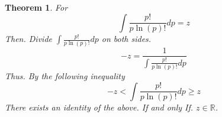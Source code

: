\documentclass[11pt, a4paper]{article}
\theoremstyle{plain}
\newtheorem{theorem}{Theorem}[section]
\theoremstyle{definition}
\theoremstyle{remark}
\begin{document}
\begin{theorem}
  For
  \begin{equation}
    \int \frac{p!}{p\ln \left(p\right)!}dp = z
  \end{equation}
  Then. Divide $\int \frac{p!}{p\ln \left(p\right)!}dp$ on both sides.
  \begin{equation}
    -z = \frac{1}{\int \frac{p!}{p\ln \left(p\right)!}dp}
  \end{equation}
  Thus. By the following inequality
  \begin{equation}
    -z < \int \frac{p!}{p\ln \left(p\right)!}dp \geq z
  \end{equation}
  There exists an identity of the above. If and only If. $z \in \mathbb{R}$.
\end{theorem}
\end{document}
